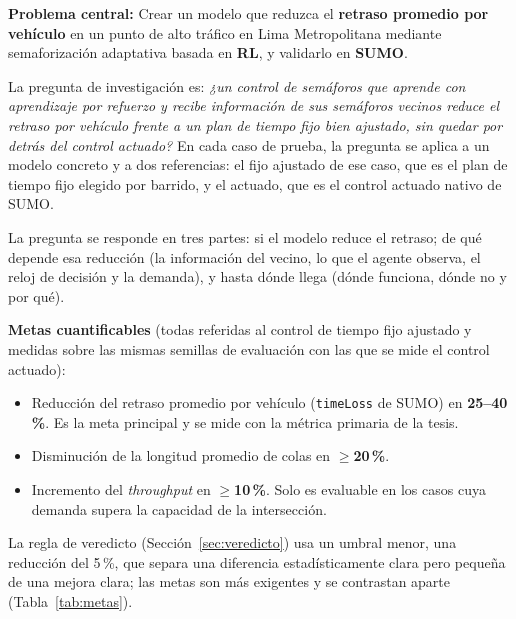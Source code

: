 
\textbf{Problema central:} Crear un modelo que reduzca el \textbf{retraso promedio por vehículo} en un punto de alto tráfico en Lima Metropolitana mediante semaforización adaptativa basada en \textbf{RL}, y validarlo en \textbf{SUMO}.

La pregunta de investigación es: \emph{¿un control de semáforos que aprende con aprendizaje por refuerzo y recibe información de sus semáforos vecinos reduce el retraso por vehículo frente a un plan de tiempo fijo bien ajustado, sin quedar por detrás del control actuado?} En cada caso de prueba, la pregunta se aplica a un modelo concreto y a dos referencias: el fijo ajustado de ese caso, que es el plan de tiempo fijo elegido por barrido, y el actuado, que es el control actuado nativo de SUMO.

La pregunta se responde en tres partes: si el modelo reduce el retraso; de qué depende esa reducción (la información del vecino, lo que el agente observa, el reloj de decisión y la demanda), y hasta dónde llega (dónde funciona, dónde no y por qué).

\textbf{Metas cuantificables} (todas referidas al control de tiempo fijo ajustado y medidas sobre las mismas semillas de evaluación con las que se mide el control actuado):
\begin{itemize}
    \item Reducción del retraso promedio por vehículo (\texttt{timeLoss} de SUMO) en \textbf{25--40\,\%}. Es la meta principal y se mide con la métrica primaria de la tesis.
    \item Disminución de la longitud promedio de colas en \textbf{$\geq$20\,\%}.
    \item Incremento del \textit{throughput} en \textbf{$\geq$10\,\%}. Solo es evaluable en los casos cuya demanda supera la capacidad de la intersección.
\end{itemize}

La regla de veredicto (Sección~\ref{sec:veredicto}) usa un umbral menor, una reducción del 5\,\%, que separa una diferencia estadísticamente clara pero pequeña de una mejora clara; las metas son más exigentes y se contrastan aparte (Tabla~\ref{tab:metas}).


